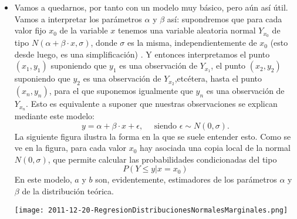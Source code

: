 \begin{itemize}
    \item Vamos a quedarnos, por tanto con un modelo muy básico, pero aún así útil. Vamos a interpretar los parámetros $\alpha$ y $\beta$ así: supondremos que para cada valor fijo $x_0$ de la variable $x$ tenemos una variable aleatoria normal $Y_{x_0}$ de tipo $N(\alpha+\beta\cdot x,\sigma)$, donde $\sigma$ es la misma, independientemente de $x_0$ (esto desde luego, es una simplificación) . Y entonces interpretamos el punto        $(x_1,y_1)$ suponiendo que $y_1$ es una observación de $Y_{x_1}$, el punto $(x_2,y_2)$ suponiendo que $y_2$ es una observación de $Y_{x_2}$,etcétera, hasta el punto $(x_n,y_n)$, para el que suponemos igualmente que $y_n$ es una observación de $Y_{x_n}$. Esto es equivalente a suponer que nuestras observaciones se explican mediante este modelo:
        \[y=\alpha +\beta\cdot x+\epsilon,\quad\mbox{ siendo }\epsilon\sim N(0,\sigma).\]
        La siguiente figura ilustra la forma en la que se suele entender esto. Como se ve en la figura, para cada valor $x_0$ hay asociada una copia local de la normal $N(0,\sigma)$, que permite calcular las probabilidades condicionadas del tipo
        \[P(Y\leq y|x=x_0)\]
        En este modelo, $a$ y $b$ son, evidentemente, estimadores de los parámetros $\alpha$ y $\beta$ de la distribución teórica.
        \begin{center}
        \texttt{[image: 2011-12-20-RegresionDistribucionesNormalesMarginales.png]}
        \end{center}


\end{itemize}
